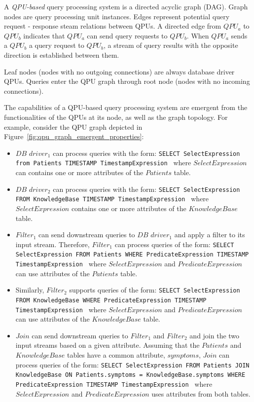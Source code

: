 A \textit{QPU-based} query processing system is a directed acyclic graph (DAG).
Graph nodes are query processing unit instances.
Edges represent potential query request - response steam relations between QPUs.
A directed edge from $QPU_a$ to $QPU_b$ indicates that $QPU_a$ can send query requests to $QPU_b$.
When $QPU_a$ sends a $QPU_b$ a query request to $QPU_b$, a stream of query results with the opposite direction is established between them.

Leaf nodes (nodes with no outgoing connections) are always database driver QPUs.
Queries enter the QPU graph through root node (nodes with no incoming connections).

The capabilities of a QPU-based query processing system are emergent from the functionalities of the QPUs at its node, as well as the
graph topology.
For example, consider the QPU graph depicted in Figure~\ref{fig:qpu_graph_emergent_properties}:
\begin{itemize}

  \item $DB$ $driver_1$ can process queries with the form:
  {\obeylines\obeyspaces
  \texttt{SELECT SelectExpression from Patients TIMESTAMP TimestampExpression
  }}
  where $SelectExpression$ can contains one or more attributes of the $Patients$ table.

\item $DB$ $driver_2$ can process queries with the form:
{\obeylines\obeyspaces
\texttt{SELECT SelectExpression FROM KnowledgeBase TIMESTAMP TimestampExpression
}}
where $SelectExpression$ contains one or more attributes of the $KnowledgeBase$ table.

\item $Filter_1$ can send downstream queries to $DB$ $driver_1$
and apply a filter to its input stream.
Therefore, $Filter_1$ can process queries of the form:
{\obeylines\obeyspaces
\texttt{SELECT SelectExpression FROM Patients
        WHERE PredicateExpression
        TIMESTAMP TimestampExpression
        }}
where $SelectExpression$ and $PredicateExpression$ can use attributes of the $Patients$ table.

\item Similarly, $Filter_2$ supports queries of the form:
{\obeylines\obeyspaces
\texttt{SELECT SelectExpression FROM KnowledgeBase
        WHERE PredicateExpression
        TIMESTAMP TimestampExpression
        }}
where $SelectExpression$ and $PredicateExpression$ can use attributes of the $KnowledgeBase$ table.

\item $Join$ can send downstream queries to $Filter_1$ and $Filter_2$
and join the two input streams based on a given attribute.
Assuming that the $Patients$ and $KnowledgeBase$ tables have a common attribute, $symptoms$,
$Join$ can process queries of the form:
{\obeylines\obeyspaces
\texttt{SELECT SelectExpression
        FROM Patients JOIN KnowledgeBase ON Patients.symptoms = KnowledgeBase.symptoms
        WHERE PredicateExpression
        TIMESTAMP TimestampExpression
        }}
where $SelectExpression$ and $PredicateExpression$ uses attributes from both tables.

\end{itemize}

